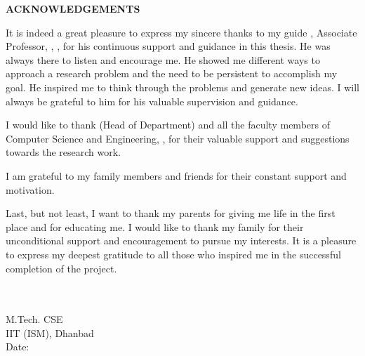 \thispagestyle{plain}

{\centering \Large \textbf{ACKNOWLEDGEMENTS} \par}
\vspace{40pt} %

\noindent It is indeed a great pleasure to express my sincere thanks to my guide \textbf{\myguide}, Associate Professor, \mydept, \myinst, for his continuous support and guidance in this thesis. He was always there to listen and encourage me. He showed me different ways to approach a research problem and the need to be persistent to accomplish my goal. He inspired me to think through the problems and generate new ideas. I will always be grateful to him for his valuable supervision and guidance.

\noindent I would like to thank \textbf{\myhod} (Head of Department) and all the faculty members of Computer Science and Engineering, \myinst, for their valuable support and suggestions towards the research work.

\noindent I am grateful to my family members and friends for their constant support and motivation.

\noindent Last, but not least, I want to thank my parents for giving me life in the first place and for educating me. I would like to thank my family for their unconditional support and encouragement to pursue my interests. It is a pleasure to express my deepest gratitude to all those who inspired me in the successful completion of the project.

\vspace{1.5cm}

\hfill
\begin{minipage}{0.3\textwidth}
    \textbf{\myname} \\
    \myrollno \\
    M.Tech. CSE \\
    IIT (ISM), Dhanbad \\
    Date: \myday\ \mymonth\ \myyear
\end{minipage}